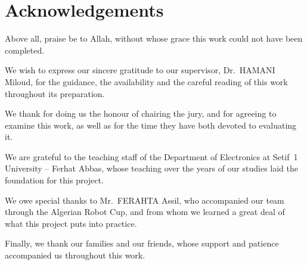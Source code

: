 \chapter*{Acknowledgements}

Above all, praise be to Allah, without whose grace this work could not have been
completed.

We wish to express our sincere gratitude to our supervisor, Dr.~HAMANI Miloud, for the
guidance, the availability and the careful reading of this work throughout its
preparation.

We thank  for doing us the honour of chairing the jury,
and  for agreeing to examine this work, as well as for the
time they have both devoted to evaluating it.

We are grateful to the teaching staff of the Department of Electronics at Setif~1
University -- Ferhat Abbas, whose teaching over the years of our studies laid the
foundation for this project.

We owe special thanks to Mr.~FERAHTA Assil, who accompanied our team through the
Algerian Robot Cup, and from whom we learned a great deal of what this project puts
into practice.


Finally, we thank our families and our friends, whose support and patience accompanied
us throughout this work.
